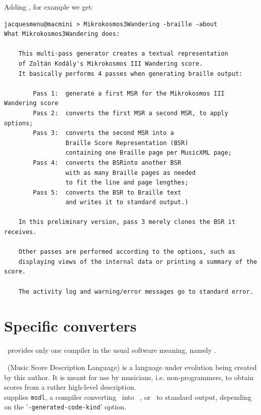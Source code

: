 Adding , for example we get:
\begin{lstlisting}[language=Terminal]
jacquesmenu@macmini > Mikrokosmos3Wandering -braille -about
What Mikrokosmos3Wandering does:

    This multi-pass generator creates a textual representation
    of Zoltán Kodály's Mikrokosmos III Wandering score.
    It basically performs 4 passes when generating braille output:

        Pass 1:  generate a first MSR for the Mikrokosmos III Wandering score
        Pass 2:  converts the first MSR a second MSR, to apply options;
        Pass 3:  converts the second MSR into a
                 Braille Score Representation (BSR)
                 containing one Braille page per MusicXML page;
        Pass 4:  converts the BSRinto another BSR
                 with as many Braille pages as needed
                 to fit the line and page lengthes;
        Pass 5:  converts the BSR to Braille text
                 and writes it to standard output.)

    In this preliminary version, pass 3 merely clones the BSR it receives.

    Other passes are performed according to the options, such as
    displaying views of the internal data or printing a summary of the score.

    The activity log and warning/error messages go to standard error.
\end{lstlisting}


\section{Specific converters}\label{Specific converters}

\mf\ provides only one compiler in the usual software meaning, namely \msdlconverter.

\msdlLang\ (Music Score Description Language) is a language under evolution being created by this author. It is meant for use by musicians, i.e. non-programmers, to obtain scores from a rather high-level description.\\
\mf supplies {\tt msdl}, a compiler converting \msdlLang\ into \guido\, \lily, \braille or \mxml\ to standard output, depending on the '{\tt -generated-code-kind}' option.

